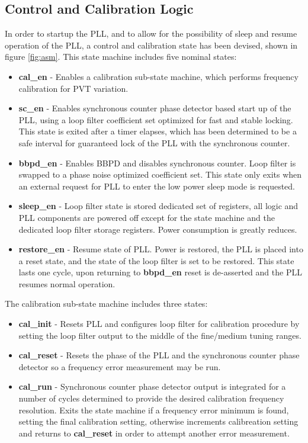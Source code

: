 	\subsection{Control and Calibration Logic}

	In order to startup the PLL, and to allow for the possibility of sleep and resume operation of the PLL, a control and calibration state has been devised, shown in figure \ref{fig:asm}. This state machine includes five nominal states:
	\begin{itemize}
			\item {\color{blue}\textbf{cal\_en}} - Enables a calibration sub-state machine, which performs frequency calibration for PVT variation.
			\item {\color{blue}\textbf{sc\_en}} - Enables synchronous counter phase detector based start up of the PLL, using a loop filter coefficient set optimized for fast and stable locking. This state is exited after a timer elapses, which has been determined to be a safe interval for guaranteed lock of the PLL with the synchronous counter. 
			\item {\color{blue}\textbf{bbpd\_en}} - Enables BBPD and disables synchronous counter. Loop filter is swapped to a phase noise optimized coefficient set. This state only exits when an external request for PLL to enter the low power sleep mode is requested. 
			\item {\color{blue}\textbf{sleep\_en}} - Loop filter state is stored dedicated set of registers, all logic and PLL components are powered off except for the state machine and the dedicated loop filter storage registers. Power consumption is greatly reduces.
			\item {\color{blue}\textbf{restore\_en}} - Resume state of PLL. Power is restored, the PLL is placed into a reset state, and the state of the loop filter is set to be restored. This state lasts one cycle, upon returning to {\color{blue}\textbf{bbpd\_en}} reset is de-asserted and the PLL resumes normal operation.
	\end{itemize}
	The calibration sub-state machine includes three states:
	\begin{itemize}
			\item {\color{blue}\textbf{cal\_init}} - Resets PLL and configures loop filter for calibration procedure by setting the loop filter output to the middle of the fine/medium tuning ranges.
			\item {\color{blue}\textbf{cal\_reset}} - Resets the phase of the PLL and the synchronous counter phase detector so a frequency error measurement may be run. 
			\item {\color{blue}\textbf{cal\_run}} - Synchronous counter phase detector output is integrated for a number of cycles determined to provide the desired calibration frequency resolution. Exits the state machine if a frequency error minimum is found, setting the final calibration setting, otherwise increments calibreation setting and returns to {\color{blue}\textbf{cal\_reset}} in order to attempt another error measurement.
	\end{itemize}


